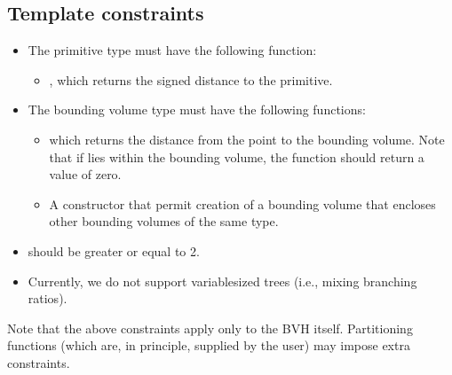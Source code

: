 \documentclass[letterpaper,10pt,english]{sphinxmanual}
\begin{document}
\subsection{Template constraints}
\label{\detokenize{ImplemBVH:chap-bvhconstraints}}\label{\detokenize{ImplemBVH:id1}}\begin{itemize}
\item {} 
\sphinxAtStartPar
The primitive type  must have the following function:
\begin{itemize}
\item {} 
\sphinxAtStartPar
{}, which returns the signed distance to the primitive.

\end{itemize}

\item {} 
\sphinxAtStartPar
The bounding volume type  must have the following functions:
\begin{itemize}
\item {} 
\sphinxAtStartPar
{} which returns the distance from the point  to the bounding volume.
Note that if  lies within the bounding volume, the function should return a value of zero.

\item {} 
\sphinxAtStartPar
A constructor  that permit creation of a bounding volume that encloses other bounding volumes of the same type.

\end{itemize}

\item {} 
\sphinxAtStartPar
{} should be greater or equal to 2.

\item {} 
\sphinxAtStartPar
Currently, we do not support variable\sphinxhyphen{}sized trees (i.e., mixing branching ratios).

\end{itemize}

\sphinxAtStartPar
Note that the above constraints apply only to the BVH itself.
Partitioning functions (which are, in principle, supplied by the user) may impose extra constraints.
\end{document}
